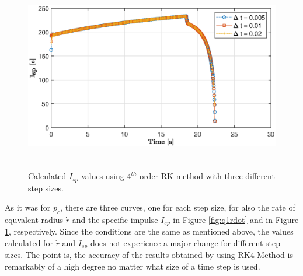 \documentclass[letterpaper,12pt]{article}
\begin{document}
\begin{figure} [!h]
	\centering
	\includegraphics[height = 8.4cm]{graphs/q1_isp.eps}
	\caption{Calculated $I_{sp}$ values using $4^{th}$ order RK method with three different step sizes.}
	\label{fig:q1Isp}
\end{figure}

As it was for $p_c$, there are three curves, one for each step size, for also the rate of equvalent radius
$\dot{r}$ and the specific impulse $I_{sp}$ in Figure \ref{fig:q1rdot} and in Figure \ref{fig:q1Isp}, respectively. 
Since the conditions are the same as mentioned above, the values calculated for $\dot{r}$ and $I_{sp}$ does not 
experience a major change for different step sizes. The point is, the accuracy of the results obtained by using RK4 Method
is remarkably of a high degree no matter what size of a time step is used.
\end{document}
